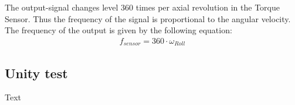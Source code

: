 The output-signal changes level 360 times per axial revolution in the Torque Sensor. Thus the frequency of the signal is proportional to the angular velocity. The frequency of the output is given by the following equation:
\begin{equation}
	\begin{split}
		f_{sensor} = 360 \cdot \omega_{Roll}
	\end{split}
\end{equation}

\subsection{Unity test}
Text